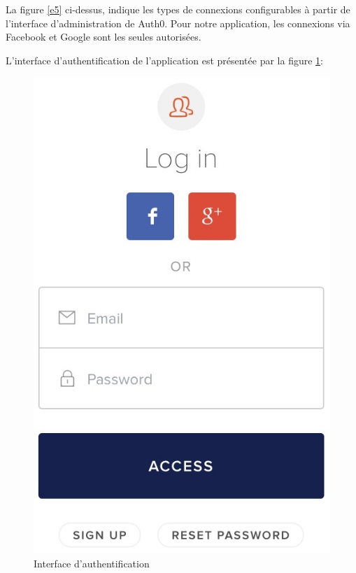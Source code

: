 La figure \ref{e5} ci-dessus, indique les types de connexions configurables à partir de l'interface d'administration de Auth0. Pour notre application, les connexions via Facebook et Google sont les seules autorisées.

\vspace{6pt}
\paragraphmark

L’interface d’authentification de l'application est présentée par la figure \ref{login}:

\begin{figure}[!ht]
\begin{center}
\includegraphics[scale=0.33]{login.jpg}
\caption{Interface d’authentification}
\label{login}
\end{center}
\end{figure}

